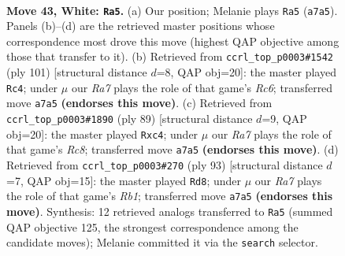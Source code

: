 \documentclass[11pt]{article}
\begin{document}
\clearpage

\begin{figure}[p]\centering
\begin{subfigure}{0.46\textwidth}\centering
\resizebox{\linewidth}{!}{%
\newchessgame
\chessboard[
  setfen={6kr/R7/8/8/p7/P5K1/8/8 w - - 10 43},
  showmover=false,
  pgfstyle=straightmove, color=movearrow, markmove={a7-a5}
]}
\caption{}
\end{subfigure}\hfill
\begin{subfigure}{0.46\textwidth}\centering
\resizebox{\linewidth}{!}{%
\newchessgame
\chessboard[
  setfen={6k1/8/8/4KR2/7P/2r2P2/8/8 b - - 0 51},
  showmover=false,
  pgfstyle=straightmove, color=movearrow, markmove={c3-c4}
]}
\caption{}
\end{subfigure}
\\[4pt]
\begin{subfigure}{0.46\textwidth}\centering
\resizebox{\linewidth}{!}{%
\newchessgame
\chessboard[
  setfen={8/5k2/1K6/1R5p/2P5/8/7P/2r5 b - - 0 45},
  showmover=false,
  pgfstyle=straightmove, color=movearrow, markmove={c1-c4}
]}
\caption{}
\end{subfigure}\hfill
\begin{subfigure}{0.46\textwidth}\centering
\resizebox{\linewidth}{!}{%
\newchessgame
\chessboard[
  setfen={1r6/8/3P4/R7/1P1k4/K7/8/8 b - - 0 47},
  showmover=false,
  pgfstyle=straightmove, color=movearrow, markmove={b8-d8}
]}
\caption{}
\end{subfigure}
\caption{\textbf{Move 43, White: \texttt{Ra5}.} (a) Our position; Melanie plays \texttt{Ra5} (\texttt{a7a5}). Panels (b)--(d) are the retrieved master positions whose correspondence most drove this move (highest QAP objective among those that transfer to it). (b) Retrieved from \texttt{ccrl\_top\_p0003\#1542} (ply 101) [structural distance $d$=8, QAP obj=20]: the master played \texttt{Rc4}; under $\mu$ our \emph{Ra7} plays the role of that game's \emph{Rc6}; transferred move \texttt{a7a5} \textbf{(endorses this move)}. (c) Retrieved from \texttt{ccrl\_top\_p0003\#1890} (ply 89) [structural distance $d$=9, QAP obj=20]: the master played \texttt{Rxc4}; under $\mu$ our \emph{Ra7} plays the role of that game's \emph{Rc8}; transferred move \texttt{a7a5} \textbf{(endorses this move)}. (d) Retrieved from \texttt{ccrl\_top\_p0003\#270} (ply 93) [structural distance $d$=7, QAP obj=15]: the master played \texttt{Rd8}; under $\mu$ our \emph{Ra7} plays the role of that game's \emph{Rb1}; transferred move \texttt{a7a5} \textbf{(endorses this move)}. Synthesis: 12 retrieved analogs transferred to \texttt{Ra5} (summed QAP objective 125, the strongest correspondence among the candidate moves); Melanie committed it via the \texttt{search} selector.}
\label{fig:thought-m84}
\end{figure}
\end{document}

